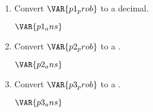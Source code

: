 
\begin{enumerate}

    \item Convert $\VAR{p1_prob}$ to a decimal.

    \vspace{20pt}
    \begin{ansenv}
        $\VAR{p1_ans}$
    \end{ansenv}
    \vfill

    \item Convert $\VAR{p2_prob}$ to a .

    \vspace{20pt}
    \begin{ansenv}
        $\VAR{p2_ans}$
    \end{ansenv}
    \vfill

    \item Convert $\VAR{p3_prob}$ to a .

    \vspace{20pt}
    \begin{ansenv}
        $\VAR{p3_ans}$
    \end{ansenv}
    \vfill

\end{enumerate}

\trueemptypage